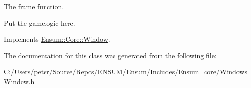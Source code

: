 The frame function. 

Put the gamelogic here. 

Implements \hyperlink{class_ensum_1_1_core_1_1_window_ae3c16f115d465bf013410573d1b935f5}{Ensum\+::\+Core\+::\+Window}.



The documentation for this class was generated from the following file\+:\begin{DoxyCompactItemize}
\item 
C\+:/\+Users/peter/\+Source/\+Repos/\+E\+N\+S\+U\+M/\+Ensum/\+Includes/\+Ensum\+\_\+core/Windows\+Window.\+h\end{DoxyCompactItemize}
